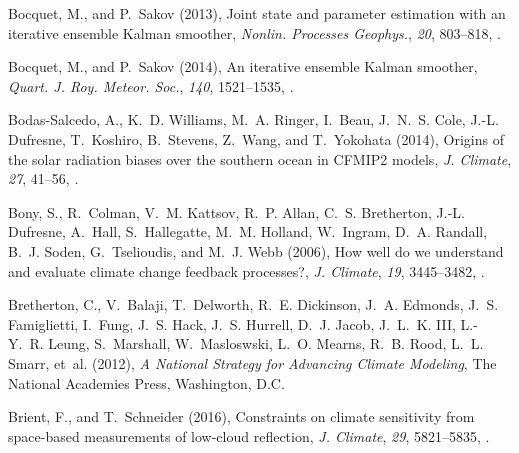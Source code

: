 \documentclass[draft]{agujournal}
\begin{document}
\begin{thebibliography}{196}
Bocquet, M., and P.~Sakov (2013), Joint state and parameter estimation with an
  iterative ensemble {K}alman smoother, \textit{Nonlin. Processes Geophys.},
  \textit{20}, 803--818, .

Bocquet, M., and P.~Sakov (2014), An iterative ensemble {K}alman smoother,
  \textit{Quart. J. Roy. Meteor. Soc.}, \textit{140}, 1521--1535,
  .

Bodas-Salcedo, A., K.~D. Williams, M.~A. Ringer, I.~Beau, J.~N.~S. Cole, J.-L.
  Dufresne, T.~Koshiro, B.~Stevens, Z.~Wang, and T.~Yokohata (2014), Origins of
  the solar radiation biases over the southern ocean in {CFMIP2} models,
  \textit{J. Climate}, \textit{27}, 41--56, .

Bony, S., R.~Colman, V.~M. Kattsov, R.~P. Allan, C.~S. Bretherton, J.-L.
  Dufresne, A.~Hall, S.~Hallegatte, M.~M. Holland, W.~Ingram, D.~A. Randall,
  B.~J. Soden, G.~Tselioudis, and M.~J. Webb (2006), How well do we understand
  and evaluate climate change feedback processes?, \textit{J. Climate},
  \textit{19}, 3445--3482, .

Bretherton, C., V.~Balaji, T.~Delworth, R.~E. Dickinson, J.~A. Edmonds, J.~S.
  Famiglietti, I.~Fung, J.~S. Hack, J.~S. Hurrell, D.~J. Jacob, J.~L.~K. III,
  L.-Y.~R. Leung, S.~Marshall, W.~Masloswski, L.~O. Mearns, R.~B. Rood, L.~L.
  Smarr, et~al. (2012), \textit{A National Strategy for Advancing Climate
  Modeling}, The National Academies Press, Washington, D.C.

Brient, F., and T.~Schneider (2016), Constraints on climate sensitivity from
  space-based measurements of low-cloud reflection, \textit{J. Climate},
  \textit{29}, 5821--5835, .


\end{thebibliography}
\end{document}
